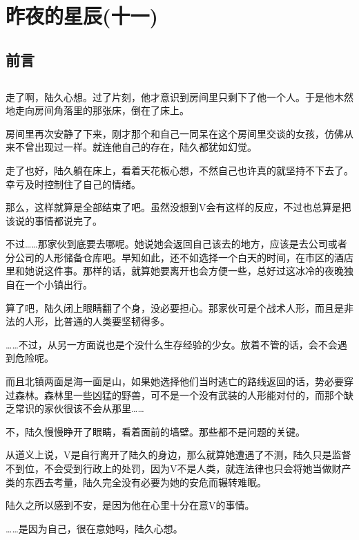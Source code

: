 \chapter{昨夜的星辰(十一)}

\section*{前言}


\section*{}

走了啊，陆久心想。过了片刻，他才意识到房间里只剩下了他一个人。于是他木然地走向房间角落里的那张床，倒在了床上。

房间里再次安静了下来，刚才那个和自己一同呆在这个房间里交谈的女孩，仿佛从来不曾出现过一样。就连他自己的存在，陆久都犹如幻觉。

走了也好，陆久躺在床上，看着天花板心想，不然自己也许真的就坚持不下去了。幸亏及时控制住了自己的情绪。

那么，这样就算是全部结束了吧。虽然没想到V会有这样的反应，不过也总算是把该说的事情都说完了。

不过……那家伙到底要去哪呢。她说她会返回自己该去的地方，应该是去公司或者分公司的人形储备仓库吧。早知如此，还不如选择一个白天的时间，在市区的酒店里和她说这件事。那样的话，就算她要离开也会方便一些，总好过这冰冷的夜晚独自在一个小镇出行。

算了吧，陆久闭上眼睛翻了个身，没必要担心。那家伙可是个战术人形，而且是非法的人形，比普通的人类要坚韧得多。

……不过，从另一方面说也是个没什么生存经验的少女。放着不管的话，会不会遇到危险呢。

而且北镇两面是海一面是山，如果她选择他们当时逃亡的路线返回的话，势必要穿过森林。森林里一些凶猛的野兽，可不是一个没有武装的人形能对付的，而那个缺乏常识的家伙很该不会从那里……

不，陆久慢慢睁开了眼睛，看着面前的墙壁。那些都不是问题的关键。

从道义上说，V是自行离开了陆久的身边，那么就算她遭遇了不测，陆久只是监督不到位，不会受到行政上的处罚，因为V不是人类，就连法律也只会将她当做财产类的东西去考量，陆久完全没有必要为她的安危而辗转难眠。

陆久之所以感到不安，是因为他在心里十分在意V的事情。

……是因为自己，很在意她吗，陆久心想。


